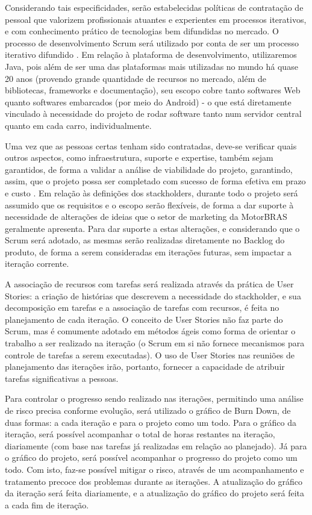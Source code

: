 \documentclass[12pt,journal,compsoc]{IEEEtran}
\begin{document}
Considerando tais especificidades, serão estabelecidas políticas de contratação de pessoal que valorizem profissionais atuantes e experientes em processos iterativos, e com conhecimento prático de tecnologias bem difundidas no mercado. O processo de desenvolvimento Scrum será utilizado por conta de ser um processo iterativo difundido \cite{scrum_development_process}. Em relação à plataforma de desenvolvimento, utilizaremos Java, pois além de ser uma das plataformas mais utilizadas no mundo há quase 20 anos \cite{tiobe_language} (provendo grande quantidade de recursos no mercado, além de bibliotecas, frameworks e documentação), seu escopo cobre tanto softwares Web quanto softwares embarcados (por meio do Android) - o que está diretamente vinculado à necessidade do projeto de rodar software tanto num servidor central quanto em cada carro, individualmente.

Uma vez que as pessoas certas tenham sido contratadas, deve-se verificar quais outros aspectos, como infraestrutura, suporte e expertise, também sejam  garantidos, de forma a validar a análise de viabilidade do projeto, garantindo, assim, que o projeto possa ser completado com sucesso de forma efetiva em prazo e custo \cite{society_software_2004}. Em relação às definições dos stackholders, durante todo o projeto será assumido que os requisitos e o escopo serão flexíveis, de forma a dar suporte à necessidade de alterações de ideias que o setor de marketing da MotorBRAS geralmente apresenta. Para dar suporte a estas alterações, e considerando que o Scrum será adotado, as mesmas serão realizadas diretamente no Backlog do produto, de forma a serem consideradas em iterações futuras, sem impactar a iteração corrente. \cite{schwaber_scrum_2013}

A associação de recursos com tarefas será realizada através da prática de User Stories: a criação de histórias que descrevem a necessidade do stackholder, e sua decomposição em tarefas e a associação de tarefas com recursos, é feita no planejamento de cada iteração. O conceito de User Stories não faz parte do Scrum, mas é comumente adotado em métodos ágeis como forma de orientar o trabalho a ser realizado na iteração \cite{user_stories_applied} (o Scrum em si não fornece mecanismos para controle de tarefas a serem executadas). O uso de User Stories nas reuniões de planejamento das iterações irão, portanto, fornecer a capacidade de atribuir tarefas significativas a pessoas.

Para controlar o progresso sendo realizado nas iterações, permitindo uma análise de risco precisa conforme evolução, será utilizado o gráfico de Burn Down, de duas formas: a cada iteração e para o projeto como um todo. Para o gráfico da iteração, será possível acompanhar o total de horas restantes na iteração, diariamente (com base nas tarefas já realizadas em relação ao planejado). Já para o gráfico do projeto, será possível acompanhar o progresso do projeto como um todo. \cite{understanding_agile_scrum} Com isto, faz-se possível mitigar o risco, através de um acompanhamento e tratamento precoce dos problemas durante as iterações. A atualização do gráfico da iteração será feita diariamente, e a atualização do gráfico do projeto será feita a cada fim de iteração.
\end{document}
